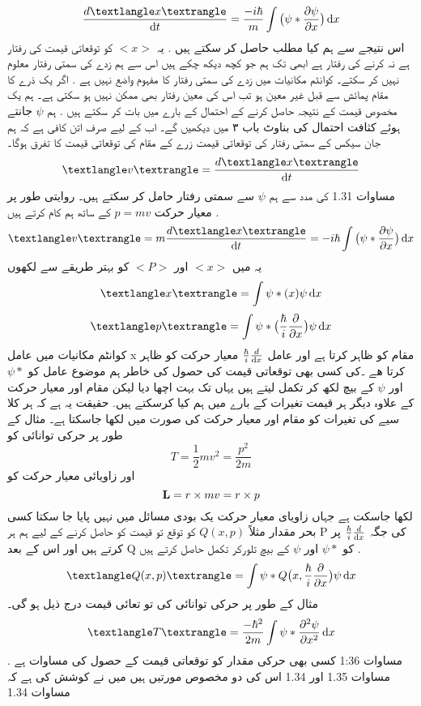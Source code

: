 \documentclass{book}
\begin{document}
\[\frac{d\textlangle x \textrangle}{\dif{t}}=\frac{-i\hbar}{m}\int\big (\psi *\frac{\partial{\psi}}{\partial{x}} \big)\dif{x}\]
اس نتیجے سے ہم کیا مطلب حاصل کر سکتے ہیں . یہ
\(<x>\)
کو توقعاتی قیمت کی رفتار ہے نہ کرنے کی رفتار ہے ابھی تک ہم جو کچھ دیکھ چکے ہیں اس سے ہم زدے کی سمتی رفتار معلوم نہیں کر سکتے۔ کوانٹم مکانیات میں زدے کی سمتی رفتار کا مفہوم واضع نہیں ہے . اگر یک ذرے کا مقام پمائش سے قبل غیر معین ہو تب اس کی معین رفتار بھی ممکن نہیں ہو سکتی ہے۔ ہم یک مخصوص قیمت کے نتیجہ حاصل کرنے کے احتمال کے بارے میں بات کر سکتے ہیں . ہم
\(\psi\)
جانتے ہوئے کثافت احتمال کی بناوٹ باب ۳ میں دیکھیں گے۔ اب کے لیے صرف اتن کافی ہے کہ ہم جان سیکس کے سمتی رفتار کی توقعاتی قیمت زرے کے مقام کی توقعاتی قیمت کا تفرق ہوگا۔
\[\textlangle v \textrangle=\frac{d\textlangle x \textrangle}{\dif{t}}\]
مساوات 1.31 کی مدد سے ہم
\(\psi\)
سے سمتی رفتار حامل کر سکتے ہیں۔ روایتی طور پر معیار حرکت
\(p=mv\)
کے ساتھ ہم کام کرتے ہیں .
\[\textlangle v \textrangle=m\frac{d\textlangle x \textrangle}{\dif{t}}=-i\hbar\int\big (\psi *\frac{\partial{\psi}}{\partial{x}} \big)\dif{x}\]
یہ میں
\(<x>\)
اور
\(<P>\)
کو بہتر طریقے سے لکھوں 
\[\textlangle x \textrangle =\int \psi *(x)\psi \dif{x}\]
\[\textlangle p \textrangle=\int \psi *\big (\frac{\hbar}{i}\frac{\partial}{\partial{x}}\big )\psi \dif{x}\]
کوانٹم مکانیات میں عامل
x
مقام کو ظاہر کرتا ہے اور عامل
\(\frac{\hbar}{i}\frac{d}{\dif{x}}\)
معیار حرکت کو ظاہر کرتا ھے ۔کی  کسی بھی توقعاتی قیمت کی حصول کی خاطر ہم موضوع عامل کو
\(\psi *\)
اور
\(\psi\)
کے بیچ لکھ کر تکمل لیتے ہیں یہاں تک بہت اچھا دیا لیکن مقام اور معیار حرکت کے علاوہ  دیگر ہر قیمت تغیرات کے بارے میں ہم کیا کرسکتے ہیں. حقیقت یہ ہے کہ ہر کلا سیے کی تغیرات کو مقام اور معیار حرکت کی صورت میں لکھا جاسکتا ہے۔ مثال کے طور پر حرکی توانائی کو
\[T=\frac{1}{2}mv^{2}=\frac{p^{2}}{2m}\]
اور زاویائی معیار حرکت کو
\[\text{\textbf{L}}=r\times mv=r\times p\]
لکھا جاسکت ہے جہاں زاویای معیار حرکت یک بودی مسائل میں نہیں پایا جا سکتا کسی بحر مقدار مثلاً
\(Q(x,p)\)
کو توقع تو قیمت کو حاصل کرنے کے لیے ہم ہر
P
کی جگہ
\(\frac{\hbar}{i}\frac{d}{\dif{x}}\)
پر کرتے ہیں اور اس کے بعد Q کو
\(\psi *\)
اور
\(\psi\)
کے بیچ تلورکر تکمل حاصل کرتے ہیں .
\[\textlangle Q(x,p) \textrangle=\int \psi *Q\big (x,\frac{\hbar}{i}\frac{\partial}{\partial{x}}\big )\psi \dif{x}\]
مثال کے طور پر حرکی توانائی کی تو تعائی قیمت درج ذیل ہو گی۔
\[\textlangle T \textrangle=\frac{-\hbar ^{2}}{2m}\int \psi *\frac{\partial ^{2}\psi}{\partial{x^{2}}}\dif{x}\]
مساوات 1:36 کسی بھی حرکی مقدار کو توقعاتی قیمت کے حصول کی مساوات ہے .
مساوات 1.35 اور 1.34  اس کی دو مخصوص مورتیں ہیں میں نے کوشش کی ہے کہ مساوات 
1.34\\
\end{document}

